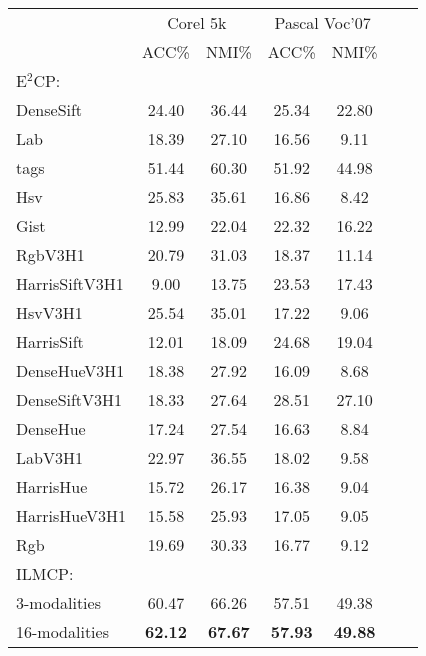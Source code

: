\begin{table}[t]
    \centering
    \setlength{\tabcolsep}{15pt}
    \begin{tabular}{lcccccc}
        \toprule
        &\multicolumn{2}{c}{Corel 5k} & \multicolumn{2}{c}{Pascal Voc'07} \\
        \cmidrule(lr){2-3}
        \cmidrule(lr){4-5}
        & ACC\% & NMI\% & ACC\% & NMI\% \\
        \midrule
        E$^2$CP: &&&&\\
        DenseSift & 24.40 & 36.44 & 25.34 & 22.80 \\ 
        Lab & 18.39 & 27.10 & 16.56 & 9.11 \\ 
        tags & 51.44 & 60.30 & 51.92 & 44.98 \\ 
        Hsv & 25.83 & 35.61 & 16.86 & 8.42 \\ 
        Gist & 12.99 & 22.04 & 22.32 & 16.22 \\ 
        RgbV3H1 & 20.79 & 31.03 & 18.37 & 11.14 \\ 
        HarrisSiftV3H1 & 9.00 & 13.75 & 23.53 & 17.43 \\ 
        HsvV3H1 & 25.54 & 35.01 & 17.22 & 9.06 \\ 
        HarrisSift & 12.01 & 18.09 & 24.68 & 19.04 \\ 
        DenseHueV3H1 & 18.38 & 27.92 & 16.09 & 8.68 \\ 
        DenseSiftV3H1 & 18.33 & 27.64 & 28.51 & 27.10 \\ 
        DenseHue & 17.24 & 27.54 & 16.63 & 8.84 \\ 
        LabV3H1 & 22.97 & 36.55 & 18.02 & 9.58 \\ 
        HarrisHue & 15.72 & 26.17 & 16.38 & 9.04 \\ 
        HarrisHueV3H1 & 15.58 & 25.93 & 17.05 & 9.05 \\ 
        Rgb & 19.69 & 30.33 & 16.77 & 9.12 \\ 
        \midrule
        ILMCP: &&&&\\
        3-modalities         & {60.47} & {66.26}  & {57.51} & {49.38} \\ 
        16-modalities         &\textbf{62.12} &\textbf{ 67.67}   & \textbf{57.93} & \textbf{49.88}   \\	
        \bottomrule
    \end{tabular}
    \label{tab4:e2cp}
\end{table}

